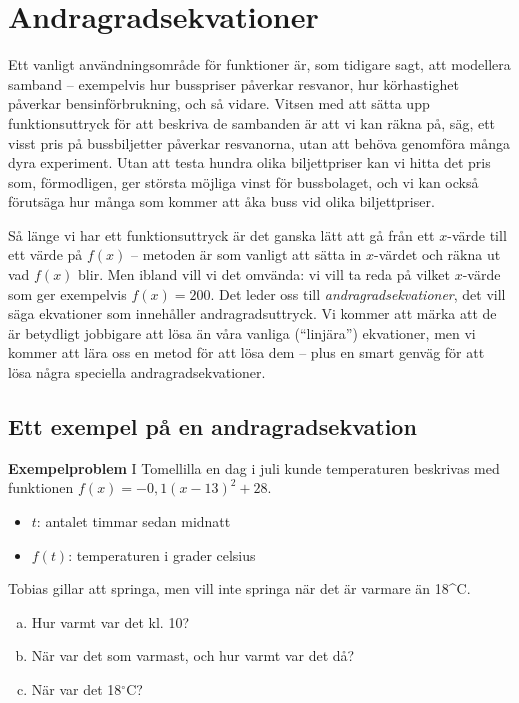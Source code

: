 \section{Andragradsekvationer}

Ett vanligt användningsområde för funktioner är, som tidigare sagt, att modellera samband -- exempelvis hur busspriser påverkar resvanor, hur körhastighet påverkar bensinförbrukning, och så vidare.
Vitsen med att sätta upp funktionsuttryck för att beskriva de sambanden är att vi kan räkna på, säg, ett visst pris på bussbiljetter påverkar resvanorna, utan att behöva genomföra många dyra experiment.
Utan att testa hundra olika biljettpriser kan vi hitta det pris som, förmodligen, ger största möjliga vinst för bussbolaget, och vi kan också förutsäga hur många som kommer att åka buss vid olika biljettpriser.

Så länge vi har ett funktionsuttryck är det ganska lätt att gå från ett $x$-värde till ett värde på $f(x)$ -- metoden är som vanligt att sätta in $x$-värdet och räkna ut vad $f(x)$ blir.
Men ibland vill vi det omvända: vi vill ta reda på vilket $x$-värde som ger exempelvis $f(x)=200$.
Det leder oss till \emph{andragradsekvationer}, det vill säga ekvationer som innehåller andragradsuttryck.
Vi kommer att märka att de är betydligt jobbigare att lösa än våra vanliga (``linjära'') ekvationer, men vi kommer att lära oss en metod för att lösa dem -- plus en smart genväg för att lösa några speciella andragradsekvationer.

\subsection{Ett exempel på en andragradsekvation}

\textbf{Exempelproblem}
I Tomellilla en dag i juli kunde temperaturen beskrivas med funktionen $f(x) = -0,1(x-13)^2+28$.
\begin{itemize}
  \item $t$: antalet timmar sedan midnatt
  \item $f(t)$: temperaturen i grader celsius
\end{itemize}

Tobias gillar att springa, men vill inte springa när det är varmare än 18^{\circ}C.

\begin{enumerate}[(a)]
  \item Hur varmt var det kl. 10?
  \item När var det som varmast, och hur varmt var det då?
  \item När var det 18$^{\circ}$C?
\end{enumerate}

